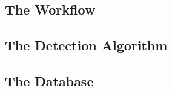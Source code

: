 \subsection{The Workflow}



\newpage
\subsection{The Detection Algorithm}
\label{detectionAlgorithm}


\newpage
\subsection{The Database}
